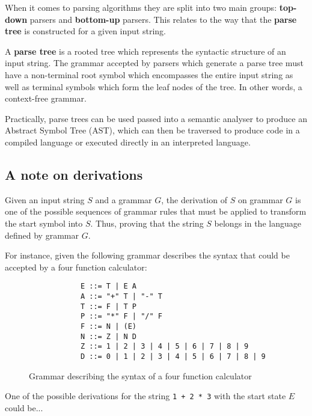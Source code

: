 \documentclass[12pt, letterpaper]{article}
\theoremstyle{definition}
\begin{document}
When it comes to parsing algorithms they are split into two main groups: \textbf{top-down} parsers and \textbf{bottom-up} parsers. This relates to the way that the \textbf{parse tree} is constructed for a given input string.

A \textbf{parse tree} is a rooted tree which represents the syntactic structure of an input string. The grammar accepted by parsers which generate a parse tree must have a non-terminal root symbol which encompasses the entire input string as well as terminal symbols which form the leaf nodes of the tree. In other words, a context-free grammar.

Practically, parse trees can be used passed into a semantic analyser to produce an Abstract Symbol Tree (AST), which can then be traversed to produce code in a compiled language or executed directly in an interpreted language.

\subsection{A note on derivations}

Given an input string $S$ and a grammar $G$, the derivation of $S$ on grammar $G$ is one of the possible sequences of grammar rules that must be applied to transform the start symbol into $S$. Thus, proving that the string $S$ belongs in the language defined by grammar $G$.

For instance, given the following grammar describes the syntax that could be accepted by a four function calculator:

\begin{figure}[h]
    \begin{center}
        \begin{verbatim}
            E ::= T | E A
            A ::= "+" T | "-" T
            T ::= F | T P
            P ::= "*" F | "/" F
            F ::= N | (E)
            N ::= Z | N D
            Z ::= 1 | 2 | 3 | 4 | 5 | 6 | 7 | 8 | 9
            D ::= 0 | 1 | 2 | 3 | 4 | 5 | 6 | 7 | 8 | 9
        \end{verbatim}
    \end{center}
    \vspace{-1.5em}
    \caption{Grammar describing the syntax of a four function calculator}
\end{figure}

\pagebreak

One of the possible derivations for the string \verb|1 + 2 * 3| with the start state $E$ could be...
\end{document}
